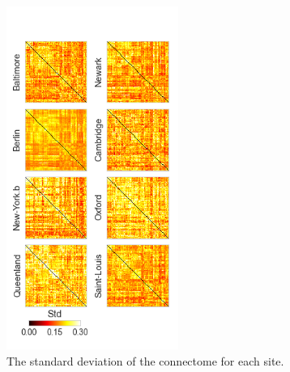 \documentclass[authoryear]{elsarticle}
\begin{document}
\begin{figure}[tbp]
\centering
\includegraphics[width=0.50\textwidth]{../figures/connectome_std_multisite2.png}
\caption[]{
The standard deviation of the connectome for each site.
}
\label{fig_std_connectomes}
\end{figure}
\end{document}
